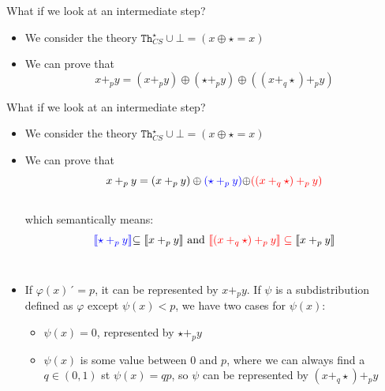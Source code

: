 \documentclass{beamer}
\newcommand{\C}{\mathcal C}
\newcommand{\Th}{\mathtt{Th}}
\begin{document}

\begin{frame}{What if we look at an intermediate step?}
\pause
    \begin{itemize}
    \item We consider the theory  \(\Th^{\star}_{CS} \cup \bot = (x \oplus \star = x)\)\\
\pause
    \item We can prove that 
    $$x +_p y = (x+_p y) \oplus (\star +_p y) \oplus ((x+_q \star) +_p y)$$ 
    \end{itemize}
\end{frame}

\begin{frame}{What if we look at an intermediate step?}
    \begin{itemize}
    \item We consider the theory  \(\Th^{\star}_{CS} \cup \bot = (x \oplus \star = x)\)\\
    \item We can prove that 
    $$x +_p y = (x+_p y) \oplus \color{blue}{(\star +_p y)} \color{black}{\oplus} \color{red}{((x+_q \star) +_p y)}$$ \\
    which semantically means: 
    $$\color{blue}{\llbracket \star +_p y \rrbracket} \color{black}{\subseteq \llbracket x+_p y \rrbracket ~\text{and}~}\color{red}{\llbracket (x+_q \star) +_p y \rrbracket} \subseteq \color{black}{\llbracket x+_p y \rrbracket}$$\\
    \pause
    \item If $\varphi(x) ´= p$, it can be represented by $x +_p y$. If $\psi$ is a subdistribution defined as $\varphi$ except $\psi(x) < p$, we have two cases for $\psi(x)$:
    \begin{itemize}
        \item $\psi(x)=0$, represented by $\star +_p y$
        \item $\psi(x)$ is some value between $0$ and $p$, where we can always find a $q \in (0,1)$ st $\psi(x)=qp$, so $\psi$ can be represented by $(x +_q \star) +_p y$
    \end{itemize}
    \end{itemize}
\end{frame}
\end{document}
